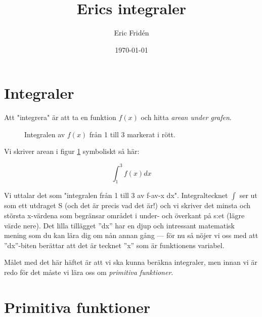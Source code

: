 \documentclass[a4paper, 12pt]{article}
\title{Erics integraler}
\author{Eric Fridén}
\date{\today}
\begin{document}
\doublespacing
\maketitle

\section{Integraler}
Att "integrera" är att ta en funktion $f(x)$ och hitta \emph{arean under grafen}. 

\begin{figure}[h]
    \centering
    \caption{Integralen av $f(x)$ från 1 till 3 markerat i rött.}
    \label{fig:1}
\end{figure}

Vi skriver arean i figur \ref{fig:1} symboliskt så här: 

\[ \int_1^3 f(x)dx \] 

Vi uttalar det som "integralen från 1 till 3 av f-av-x dx". Integraltecknet $\int$ ser ut som ett utdraget S (och det är precis vad det är!) och vi skriver det minsta och största x-värdena som begränsar området i under- och överkant på s:et (lägre värde nere). Det lilla tillägget ''dx'' har en djup och intressant matematisk mening som du kan lära dig om nån annan gång --- för nu så nöjer vi oss med att ''dx''-biten berättar att det är tecknet ''x'' som är funktionens variabel.

Målet med det här häftet är att vi ska kunna beräkna integraler, men innan vi är redo för det måste vi lära oss om \emph{primitiva funktioner}.

\section{Primitiva funktioner}
\end{document}
